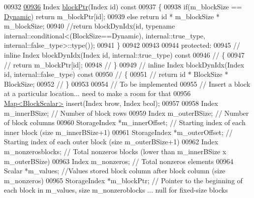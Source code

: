 \begin{DoxyCode}
00932 
\hyperlink{group___sparse_core___module_a16b8ee2d4e92d774bf286e6575fd8369}{00936}     Index \hyperlink{group___sparse_core___module_a16b8ee2d4e92d774bf286e6575fd8369}{blockPtr}(Index \textcolor{keywordtype}{id})\textcolor{keyword}{ const}
00937 \textcolor{keyword}{    }\{
00938       \textcolor{keywordflow}{if}(m\_blockSize == \hyperlink{namespace_eigen_ad81fa7195215a0ce30017dfac309f0b2}{Dynamic}) \textcolor{keywordflow}{return} m\_blockPtr[id];
00939       \textcolor{keywordflow}{else} \textcolor{keywordflow}{return} \textcolor{keywordtype}{id} * m\_blockSize * m\_blockSize;
00940       \textcolor{comment}{//return blockDynIdx(id, typename internal::conditional<(BlockSize==Dynamic), internal::true\_type,
       internal::false\_type>::type());}
00941     \}
00942 
00943 
00944   \textcolor{keyword}{protected}:
00945 \textcolor{comment}{//    inline Index blockDynIdx(Index id, internal::true\_type) const}
00946 \textcolor{comment}{//    \{}
00947 \textcolor{comment}{//      return m\_blockPtr[id];}
00948 \textcolor{comment}{//    \}}
00949 \textcolor{comment}{//    inline Index blockDynIdx(Index id, internal::false\_type) const}
00950 \textcolor{comment}{//    \{}
00951 \textcolor{comment}{//      return id * BlockSize * BlockSize;}
00952 \textcolor{comment}{//    \}}
00953 
00954     \textcolor{comment}{// To be implemented}
00955     \textcolor{comment}{// Insert a block at a particular location... need to make a room for that}
00956     \hyperlink{group___core___module_class_eigen_1_1_map}{Map<BlockScalar>} insert(Index brow, Index bcol);
00957 
00958     Index m\_innerBSize; \textcolor{comment}{// Number of block rows}
00959     Index m\_outerBSize; \textcolor{comment}{// Number of block columns}
00960     StorageIndex *m\_innerOffset; \textcolor{comment}{// Starting index of each inner block (size m\_innerBSize+1)}
00961     StorageIndex *m\_outerOffset; \textcolor{comment}{// Starting index of each outer block (size m\_outerBSize+1)}
00962     Index m\_nonzerosblocks; \textcolor{comment}{// Total nonzeros blocks (lower than  m\_innerBSize x m\_outerBSize)}
00963     Index m\_nonzeros; \textcolor{comment}{// Total nonzeros elements}
00964     Scalar *m\_values; \textcolor{comment}{//Values stored block column after block column (size m\_nonzeros)}
00965     StorageIndex *m\_blockPtr; \textcolor{comment}{// Pointer to the beginning of each block in m\_values, size m\_nonzeroblocks
       ... null for fixed-size blocks}

\end{DoxyCode}
